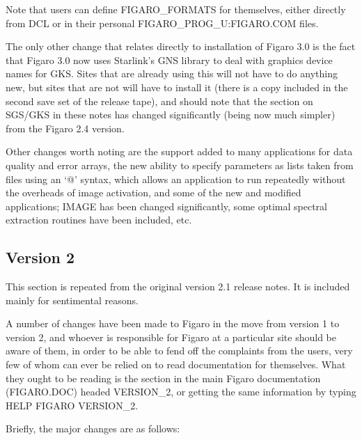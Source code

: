 Note that users can define FIGARO\_FORMATS for themselves, either directly from
DCL or in their personal FIGARO\_PROG\_U:FIGARO.COM files.

The only other change that relates directly to installation of Figaro 3.0 is
the fact that Figaro 3.0 now uses Starlink's GNS library to deal with graphics
device names for GKS. Sites that are already using this will not have to
do anything new, but sites that are not will have to install it (there is a
copy included in the second save set of the release tape), and should note
that the section on SGS/GKS in these notes has changed significantly (being now
much simpler) from the Figaro 2.4 version.

Other changes worth noting are the support added to many applications
for data quality and error arrays, the new ability to specify parameters as
lists taken from files using an `@' syntax, which allows an application to
run repeatedly without the overheads of image activation, and some of the new
and modified applications; IMAGE has been changed significantly, some
optimal spectral extraction routines have been included, etc.

\subsection{Version 2}

This section is repeated from the original version 2.1 release notes. It is
included mainly for sentimental reasons.

A number of changes have been made to Figaro in the move from version 1 to
version 2, and whoever is responsible for Figaro at a particular site should be
aware of them, in order to be able to fend off the complaints from the users,
very few of whom can ever be relied on to read documentation for themselves.
What they ought to be reading is the section in the main Figaro documentation
(FIGARO.DOC) headed VERSION\_2, or getting the same information by typing HELP
FIGARO VERSION\_2.

Briefly, the major changes are as follows:

